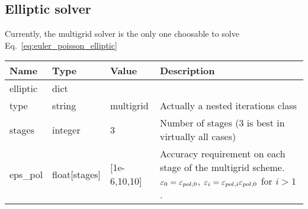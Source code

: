 \subsection{Elliptic solver}
Currently, the multigrid solver is the only one choosable
to solve Eq.~\eqref{eq:euler_poisson_elliptic}
\begin{longtable}{lllp{7.5cm}}
\toprule
\rowcolor{gray!50}\textbf{Name} &  \textbf{Type} & \textbf{Value}  & \textbf{Description}  \\ \midrule
elliptic & dict & & \\
\qquad type  & string& multigrid & Actually a nested iterations class \\
\qquad stages    & integer & 3 & Number of stages (3 is best in virtually all cases) \\
\qquad eps\_pol    & float[stages] & [1e-6,10,10] & Accuracy requirement on each stage of the multigrid scheme. $\varepsilon_0 = \varepsilon_{pol,0}$, $\varepsilon_i = \varepsilon_{pol,i} \varepsilon_{pol,0}$  for $i>1$. \\
\bottomrule
\end{longtable}
